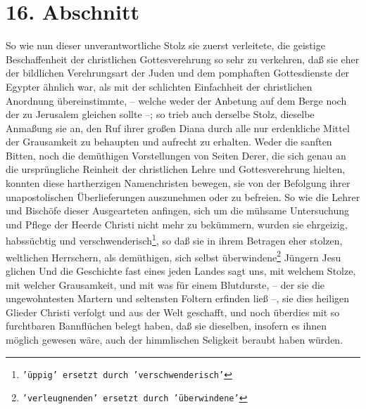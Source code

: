 \section{16. Abschnitt} \label{kap7_ab16}

So wie nun dieser unverantwortliche Stolz sie zuerst verleitete, die geistige
Beschaffenheit der christlichen Gottesverehrung so sehr zu verkehren, daß sie
eher der bildlichen Verehrungsart der Juden und dem pomphaften Gottesdienste
der Egypter ähnlich war, als mit der schlichten Einfachheit der christlichen
Anordnung übereinstimmte, -- welche weder der Anbetung auf dem Berge noch der zu
Jerusalem gleichen sollte --; so trieb auch derselbe Stolz, dieselbe
Anmaßung sie an, den Ruf ihrer großen Diana durch alle nur erdenkliche
Mittel der Grausamkeit zu behaupten und aufrecht zu erhalten. Weder die sanften
Bitten, noch die demüthigen Vorstellungen von Seiten Derer, die sich genau an
die ursprüngliche Reinheit der christlichen Lehre und Gottesverehrung hielten,
konnten diese hartherzigen Namenchristen bewegen, sie von der Befolgung ihrer
unapostolischen Überlieferungen auszunehmen oder zu befreien. So wie die Lehrer
und Bischöfe dieser Ausgearteten anfingen, sich um die mühsame Untersuchung und
Pflege der Heerde Christi nicht mehr zu bekümmern, wurden sie ehrgeizig,
habssücbtig und verschwenderisch\footnote{\texttt{'üppig' ersetzt durch 'verschwenderisch'}}, so daß sie in ihrem Betragen eher stolzen, weltlichen
Herrschern, als demüthigen, sich selbst überwindene\footnote{\texttt{'verleugnenden' ersetzt durch 'überwindene'}} Jüngern Jesu glichen
Und die Geschichte fast eines jeden Landes sagt uns, mit welchem Stolze, mit
welcher Grausamkeit, und mit was für einem Blutdurste, -- der sie die
ungewohntesten Martern und seltensten Foltern erfinden ließ --, sie dies
heiligen Glieder Christi verfolgt und aus der Welt geschafft, und noch
überdies mit so furchtbaren Bannflüchen belegt haben, daß sie dieselben,
insofern es ihnen möglich gewesen wäre, auch der himmlischen Seligkeit beraubt
haben würden.

\medskip

